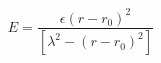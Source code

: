 \documentclass[12pt]{article}
\begin{document}
$$
  E = \frac{\epsilon (r - r_0)^2}{ [ \lambda^2 - (r - r_0)^2 ]}
$$
\end{document}
